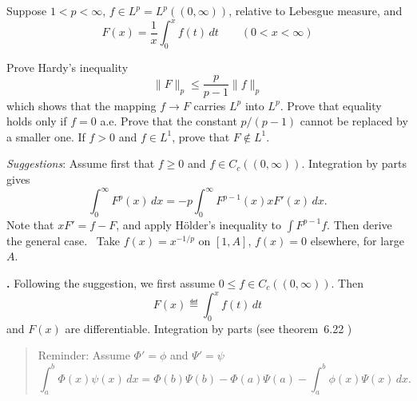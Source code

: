 \begin{enumerate}
\begin{itemize}
\end{itemize}

\begin{excopy}
Suppose \(1<p<\infty\), \(f\in L^p=L^p((0,\infty))\),
relative to Lebesgue measure, and
\begin{equation*}
 F(x) = \frac{1}{x} \int_0^x f(t)\,dt \qquad (0<x<\infty)
\end{equation*}
\begin{itemize}
 Prove Hardy's inequality
 \begin{equation*}
  \|F\|_p \leq \frac{p}{p-1} \|f\|_p
 \end{equation*}
 which shows that the mapping \(f\to F\) carries \(L^p\) into \(L^p\).
 Prove that equality holds only if \(f=0\) a.e.
 Prove that the constant \(p/(p-1)\) cannot be replaced by a smaller one.
 If \(f>0\) and \(f\in L^1\), prove that \(F\notin L^1\).\newline
\end{itemize}
 \qquad \emph{Suggestions}:  Assume first that \(f\geq 0\) and
 \(f\in C_c((0,\infty))\). Integration by parts gives
 \begin{equation*}
   \int_0^\infty F^p(x)\,dx = -p \int_0^\infty F^{p-1}(x)xF'(x)\,dx.
 \end{equation*}
 Note that \(xF' = f - F\), and apply
 H\"older's inequality to \(\int F^{p-1}f\).
 Then derive the general case.
 ~Take \(f(x)=x^{-1/p}\) on \([1,A]\), \(f(x)=0\) elsewhere,
 for large $A$.
\end{excopy}



\textbf{.}
Following the suggestion, we first assume \(0\leq f\in C_c((0,\infty))\).
Then
\begin{equation*}
F(x) \eqdef \int_0^x f(t)\,dt
\end{equation*}
and \(F(x)\) are differentiable.
Integration by parts (see theorem~6.22 \cite{RudinPMA85})\\

\begin{quote}
\footnotesize
 Reminder: Assume \(\Phi'=\phi\) and \(\Psi'=\psi\)
 \begin{equation*}
  \int_a^b \Phi(x)\psi(x)\,dx
  = \Phi(b)\Psi(b) - \Phi(a)\Psi(a) - \int_a^b \phi(x)\Psi(x)\,dx.
 \end{equation*}
\end{quote}


\end{enumerate}
